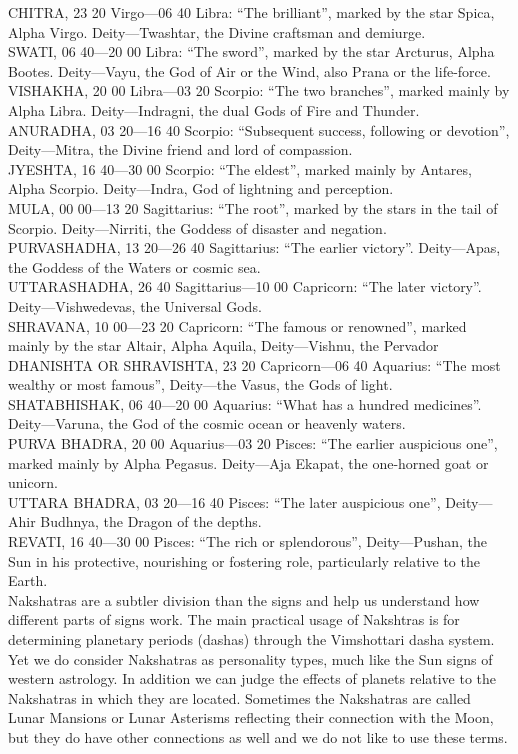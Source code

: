 CHITRA, 23 20 Virgo—06 40 Libra:  “The brilliant”, marked by the star Spica, Alpha Virgo. Deity—Twashtar, the Divine craftsman and demiurge.\\
SWATI, 06 40—20 00 Libra:  “The sword”, marked by the star Arcturus, Alpha Bootes. Deity—Vayu, the God of Air or the Wind, also Prana or the life-force.\\
VISHAKHA, 20 00 Libra—03 20 Scorpio:  “The two branches”, marked mainly by Alpha Libra. Deity—Indragni, the dual Gods of Fire and Thunder.\\
ANURADHA, 03 20—16 40 Scorpio:  “Subsequent success, following or devotion”, Deity—Mitra, the Divine friend and lord of compassion.\\
JYESHTA, 16 40—30 00 Scorpio:  “The eldest”, marked mainly by Antares, Alpha Scorpio. Deity—Indra, God of lightning and perception.\\
MULA, 00 00—13 20 Sagittarius:  “The root”, marked by the stars in the tail of Scorpio. Deity—Nirriti, the Goddess of disaster and negation.\\
PURVASHADHA, 13 20—26 40 Sagittarius:  “The earlier victory”. Deity—Apas, the Goddess of the Waters or cosmic sea.\\
UTTARASHADHA, 26 40 Sagittarius—10 00 Capricorn:  “The later victory”. Deity—Vishwedevas, the Universal Gods.\\
SHRAVANA, 10 00—23 20 Capricorn:  “The famous or renowned”, marked mainly by the star Altair, Alpha Aquila, Deity—Vishnu, the Pervador\\
DHANISHTA OR SHRAVISHTA, 23 20 Capricorn—06 40 Aquarius:  “The most wealthy or most famous”, Deity—the Vasus, the Gods of light.\\
SHATABHISHAK, 06 40—20 00 Aquarius:  “What has a hundred medicines”. Deity—Varuna, the God of the cosmic ocean or heavenly waters.\\
PURVA BHADRA, 20 00 Aquarius—03 20 Pisces:  “The earlier auspicious one”, marked mainly by Alpha Pegasus. Deity—Aja Ekapat, the one-horned goat or unicorn.\\
UTTARA BHADRA, 03 20—16 40 Pisces:  “The later auspicious one”, Deity—Ahir Budhnya, the Dragon of the depths.\\
REVATI, 16 40—30 00 Pisces:  “The rich or splendorous”, Deity—Pushan, the Sun in his protective, nourishing or fostering role, particularly relative to the Earth.\\
 

Nakshatras are a subtler division than the signs and help us understand how different parts of signs work. The main practical usage of Nakshtras is for determining planetary periods (dashas) through the Vimshottari dasha system. Yet we do consider Nakshatras as personality types, much like the Sun signs of western astrology. In addition we can judge the effects of planets relative to the Nakshatras in which they are located. Sometimes the Nakshatras are called Lunar Mansions or Lunar Asterisms reflecting their connection with the Moon, but they do have other connections as well and we do not like to use these terms.

